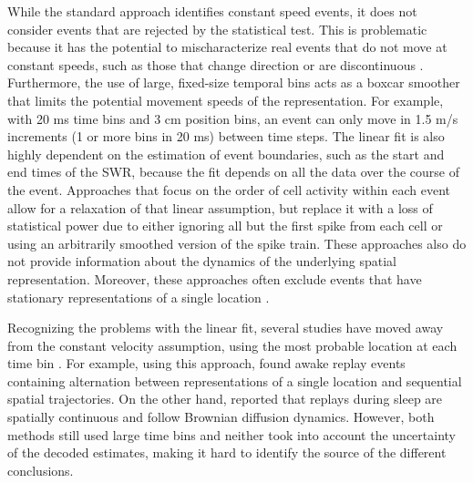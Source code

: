 \documentclass[9pt,lineno]{elife}
\begin{document}
While the standard approach identifies constant speed events, it does not consider events that are rejected by the statistical test. This is problematic because it has the potential to mischaracterize real events that do not move at constant speeds, such as those that change direction or are discontinuous \citep{LiuMethodsAssessmentMemory2018}. Furthermore, the use of large, fixed-size temporal bins acts as a boxcar smoother that limits the potential movement speeds of the representation. For example, with 20 ms time bins and 3 cm position bins, an event can only move in 1.5 m/s increments (1 or more bins in 20 ms) between time steps. The linear fit is also highly dependent on the estimation of event boundaries, such as the start and end times of the SWR, because the fit depends on all the data over the course of the event. Approaches that focus on the order of cell activity within each event \citep{LeeMemorySequentialExperience2002, GuptaHippocampalReplayNot2010} allow for a relaxation of that linear assumption, but replace it with a loss of statistical power due to either ignoring all but the first spike from each cell or using an arbitrarily smoothed version of the spike train. These approaches also do not provide information about the dynamics of the underlying spatial representation. Moreover, these approaches often exclude events that have stationary representations of a single location \citep{YuDistincthippocampalcorticalmemory2017, FarooqEmergencepreconfiguredplastic2019}. 

Recognizing the problems with the linear fit, several studies have moved away from the constant velocity assumption, using the most probable location at each time bin \citep{KaeferReplayBehavioralSequences2020, CareyRewardrevaluationbiases2019, GrosmarkDiversityneuralfiring2016, WuHippocampalReplayCaptures2014, PfeifferHippocampalplacecellsequences2013}. For example, using this approach, \cite{PfeifferAutoassociativedynamicsgeneration2015} found awake replay events containing alternation between representations of a single location and sequential spatial trajectories. On the other hand, \cite{StellaHippocampalReactivationRandom2019} reported that replays during sleep are spatially continuous and follow Brownian diffusion dynamics. However, both methods still used large time bins and neither took into account the uncertainty of the decoded estimates, making it hard to identify the source of the different conclusions.
\end{document}
